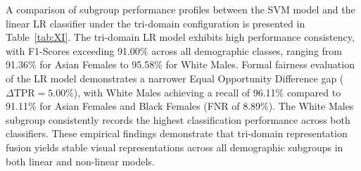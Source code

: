 A comparison of subgroup performance profiles between the SVM model and the linear LR classifier under the tri-domain configuration is presented in Table~\ref{tab:XI}. The tri-domain LR model exhibits high performance consistency, with F1-Scores exceeding 91.00\% across all demographic classes, ranging from 91.36\% for Asian Females to 95.58\% for White Males. Formal fairness evaluation of the LR model demonstrates a narrower Equal Opportunity Difference gap ($\Delta\text{TPR} = 5.00\%$), with White Males achieving a recall of 96.11\% compared to 91.11\% for Asian Females and Black Females (FNR of 8.89\%). The White Males subgroup consistently records the highest classification performance across both classifiers. These empirical findings demonstrate that tri-domain representation fusion yields stable visual representations across all demographic subgroups in both linear and non-linear models.
